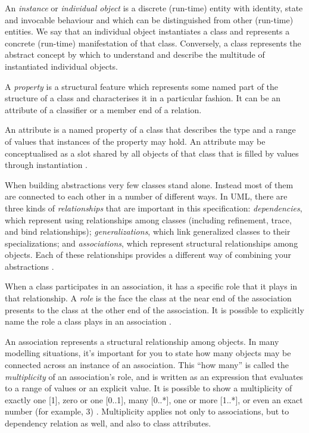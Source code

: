 	An \textit{instance} or \textit{individual object} is a discrete (run-time) entity with identity, state and invocable behaviour and which can be distinguished from other (run-time) entities. We say that an individual object instantiates a class and represents a concrete (run-time) manifestation of that class. Conversely, a class represents the abstract concept by which to understand and describe the multitude of instantiated individual objects. 
	
	A \textit{property} is a structural feature which represents some named part of the structure of a class and characterises it in a particular fashion. It can be an attribute of a classifier or a member end of a relation.
	
	An attribute is a named property of a class that describes the type and a range of values that instances of the property may hold. An attribute may be conceptualised as a slot  shared by all objects of that class that is filled by values through instantiation \cite{uml-userguide}.
	
	When building abstractions very few classes stand alone. Instead most of them are connected to each other in a number of different ways. In UML, there are three kinds of \textit{relationships} that are important in this specification: \textit{dependencies}, which represent using relationships among classes (including refinement, trace, and bind relationships); \textit{generalizations}, which link generalized classes to their specializations; and \textit{associations}, which represent structural relationships among objects. Each of these relationships provides a different way of combining your abstractions \cite{uml-userguide}.
	
	When a class participates in an association, it has a specific role that it plays in that relationship. A \textit{role} is the face the class at the near end of the association presents to the class at the other end of the association. It is possible to explicitly name the role a class plays in an association \cite{uml-userguide}.  
	
	An association represents a structural relationship among objects. In many modelling situations, it's important for you to state how many objects may be connected across an instance of an association. This ``how many'' is called the \textit{multiplicity} of an association's role, and is written as an expression that evaluates to a range of values or an explicit value. It is possible to show a multiplicity of exactly one [1], zero or one [0..1], many [0..*], one or more [1..*], or even an exact number (for example, 3) \cite{uml-userguide}. Multiplicity applies not only to associations, but to dependency relation as well, and also to class attributes.
	
